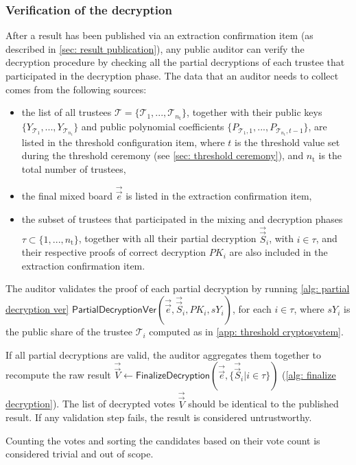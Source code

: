 \subsubsection{Verification of the decryption} \label{sec: verification of decryption}
After a result has been published via an extraction confirmation item (as described in \cref{sec: result publication}), any public auditor can verify the decryption procedure by checking all the partial decryptions of each trustee that participated in the decryption phase. The data that an auditor needs to collect comes from the following sources:
\begin{itemize}
    \item the list of all trustees $\boldsymbol{\mathcal{T}} = \{ \mathcal{T}_1, ..., \mathcal{T}_{n_\mathrm{t}} \}$, together with their public keys $\{ Y_{\mathcal{T}_1}, ..., Y_{\mathcal{T}_{n_\mathrm{t}}} \}$ and public polynomial coefficients $\{ P_{\mathcal{T}_1, 1}, ..., P_{\mathcal{T}_{n_\mathrm{t}}, t-1} \}$, are listed in the threshold configuration item, where $t$ is the threshold value set during the threshold ceremony (see \cref{sec: threshold ceremony}), and $n_\mathrm{t}$ is the total number of trustees,
    \item the final mixed board $\vec{\vec{e}}$ is listed in the extraction confirmation item,
    \item the subset of trustees that participated in the mixing and decryption phases $\tau \subset \{ 1, ..., n_\mathrm{t} \}$, together with all their partial decryption $\vec{\vec{S}}_i$, with $i \in \tau$, and their respective proofs of correct decryption $PK_i$ are also included in the extraction confirmation item.
\end{itemize}

The auditor validates the proof of each partial decryption by running \cref{alg: partial decryption ver} $\mathsf{PartialDecryptionVer} (\vec{\vec{e}}, \vec{\vec{S}}_i, PK_i, sY_i)$, for each $i \in \tau$, where $sY_i$ is the public share of the trustee $\mathcal{T}_i$ computed as in \cref{app: threshold cryptosystem}.

If all partial decryptions are valid, the auditor aggregates them together to recompute the raw result $\vec{\vec{V}} \gets \mathsf{FinalizeDecryption} (\vec{\vec{e}}, \{ \vec{\vec{S}}_i | i \in \tau \})$ (\cref{alg: finalize decryption}). The list of decrypted votes $\vec{\vec{V}}$ should be identical to the published result. If any validation step fails, the result is considered untrustworthy.

Counting the votes and sorting the candidates based on their vote count is considered trivial and out of scope.
